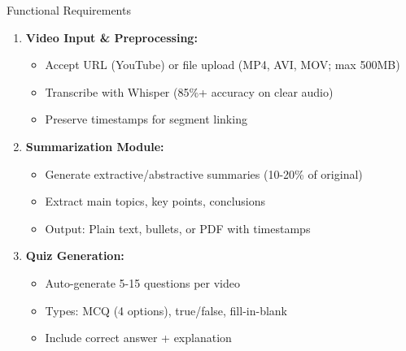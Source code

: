 \documentclass{beamer}
\begin{document}
\begin{frame}{Functional Requirements}
    \begin{enumerate}
        \item \textbf{Video Input \& Preprocessing:}
            \begin{itemize}
                \item Accept URL (YouTube) or file upload (MP4, AVI, MOV; max 500MB)
                \item Transcribe with Whisper (85\%+ accuracy on clear audio)
                \item Preserve timestamps for segment linking
            \end{itemize}
        
        \item \textbf{Summarization Module:}
            \begin{itemize}
                \item Generate extractive/abstractive summaries (10-20\% of original)
                \item Extract main topics, key points, conclusions
                \item Output: Plain text, bullets, or PDF with timestamps
            \end{itemize}
        
        \item \textbf{Quiz Generation:}
            \begin{itemize}
                \item Auto-generate 5-15 questions per video
                \item Types: MCQ (4 options), true/false, fill-in-blank
                \item Include correct answer + explanation
            \end{itemize}
    \end{enumerate}
\end{frame}
\end{document}
